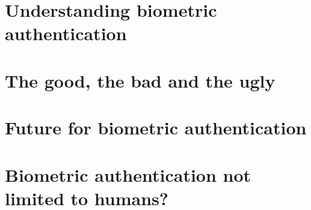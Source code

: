 \documentclass[a4paper,12pt,fleqn]{article}
\begin{document}

\tableofcontents






\newpage
\section{Understanding biometric authentication}\label{sec:definition}


\newpage
\section{The good, the bad and the ugly}\label{sec:systems}


\section{Future for biometric authentication}\label{sec:future}


\section{Biometric authentication not limited to humans?}




\newpage
\end{document}

